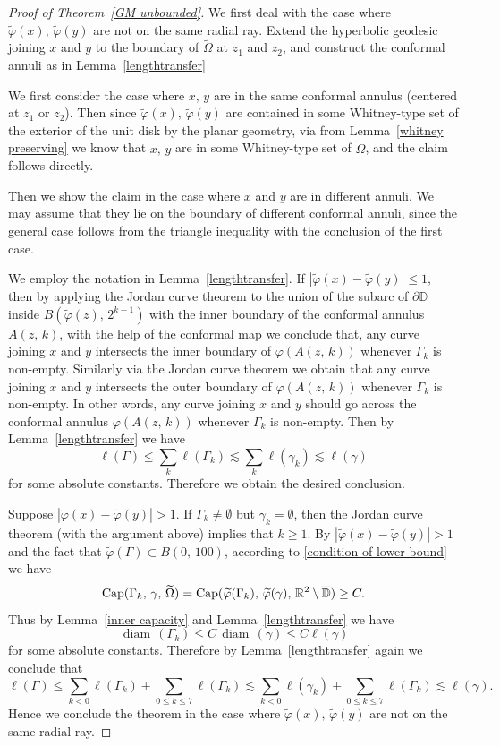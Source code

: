 \documentclass[reqno,11pt]{amsart}
\def\wz{\widetilde}
\def\ls{\lesssim}
\def\diam{{\mathop\mathrm{\,diam\,}}}
\numberwithin{equation}{section}
\theoremstyle{remark}
\begin{document}
\begin{proof}[Proof of Theorem~\ref{GM unbounded}]
We first deal with the case where $\wz \varphi(x),\,\wz \varphi(y)$ are not on the same radial ray. 
Extend the hyperbolic geodesic joining $x$ and $y$ to the boundary of $\wz \Omega$ at $z_1$ and $z_2$, and construct the conformal annuli as in Lemma~\ref{lengthtransfer} 

We first consider the case where $x,\,y$ are in the same conformal annulus (centered at $z_1$ or $z_2$). Then  since $\wz \varphi(x),\,\wz \varphi(y)$ are contained in some Whitney-type set of the exterior of the unit disk by the planar geometry, via  from Lemma~\ref{whitney preserving} we know that $x,\,y$ are in some Whitney-type set of $\wz \Omega$, and the claim follows directly. 


Then we show the claim in the case where $x$ and $y$ are in different annuli. We may assume that they lie on the boundary of different conformal annuli, since the general case follows from the triangle inequality with the conclusion of the first case. 

We employ the notation in Lemma~\ref{lengthtransfer}. 
If $|\wz \varphi (x)-\wz \varphi (y)|\le 1$, then by applying the Jordan curve theorem to the union of the subarc of $\partial \mathbb D$ inside
$B(\wz \varphi(z),\,2^{k-1})$
 with the inner boundary of the conformal annulus $A(z,\,k)$, with the help of the conformal map we conclude that, any curve joining $x$ and $y$ intersects the inner boundary of $\varphi(A(z,\,k))$ whenever $\Gamma_k$ is non-empty. Similarly via the Jordan curve theorem we obtain that any curve joining $x$ and $y$  intersects the outer boundary of $\varphi(A(z,\,k))$ whenever $\Gamma_k$ is non-empty.  
In other words,  any curve joining $x$ and $y$ should go across the conformal annulus $\varphi(A(z,\,k))$ whenever $\Gamma_k$ is non-empty. 
Then by Lemma~\ref{lengthtransfer} we have
$$\ell(\Gamma)\le \sum_{k} \ell(\Gamma_k) \ls \sum_k \ell(\gamma_k) \ls \ell(\gamma) $$
for some absolute constants. 
Therefore we obtain the desired conclusion.

Suppose $|\wz \varphi (x)-\wz \varphi (y)|> 1$. If $\Gamma_k\neq \emptyset$   but $\gamma_k=\emptyset$, then the Jordan curve theorem (with the argument above) implies that $k\ge 1$. By $|\wz \varphi (x)-\wz \varphi (y)|> 1$ and  the fact that $\wz  \varphi (\Gamma)\subset B(0,\,100)$, according to \eqref{condition of lower bound} we have
$${\rm Cap}(\Gamma_k,\,\gamma,\,\wz \Omega)={\rm Cap}(\wz \varphi (\Gamma_k),\,\wz \varphi(\gamma),\,\mathbb R^2\setminus \overline{\mathbb D})\ge C.$$
Thus by Lemma~\ref{inner capacity} and Lemma~\ref{lengthtransfer} we have
$$\diam(\Gamma_k) \le C \diam(\gamma)\le C \ell(\gamma)$$
for some absolute constants. 
Therefore by Lemma~\ref{lengthtransfer} again we conclude that
$$\ell(\Gamma)\le \sum_{k<0} \ell(\Gamma_k) +\sum_{0\le k\le 7}  \ell(\Gamma_k) \ls \sum_{k<0} \ell(\gamma_k) + \sum_{0\le k\le 7}  \ell(\Gamma_k)  \ls \ell(\gamma). $$
Hence we conclude the theorem in the case  where $\wz \varphi(x),\,\wz \varphi(y)$ are not on the same radial ray. 


\end{proof}
\end{document}

